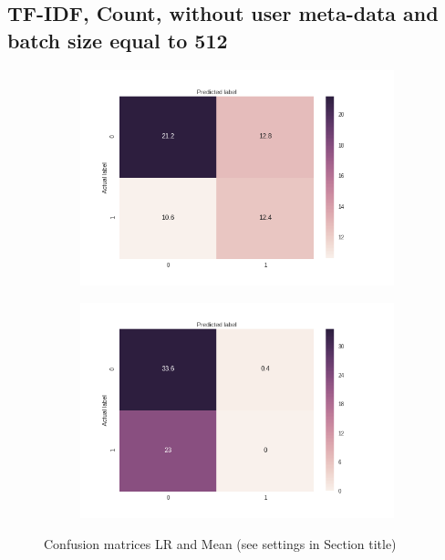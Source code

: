 \documentclass[sigconf]{acmart-txmm}
\begin{document}
\subsection{TF-IDF, Count, without user meta-data and batch size equal to 512}

\begin{figure}[H]
\centering
\begin{subfigure}
  \centering
  \includegraphics[width=1\linewidth]{report/img/conf_matrices/keywords_tfidf_count_0_0_512_LR.png}
  \label{fig:keywords_tfidf_count_0_0_512_LR}
\end{subfigure}%
\begin{subfigure}
  \centering
  \includegraphics[width=1\linewidth]{report/img/conf_matrices/keywords_tfidf_count_0_0_512_mean.png}
  \label{fig:keywords_tfidf_count_0_0_512_mean}
\end{subfigure}
\caption{Confusion matrices LR and Mean (see settings in Section title)}
\label{fig:keywords_tfidf_count_0_0_512}
\end{figure}
\end{document}
